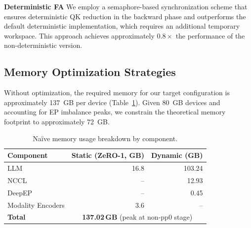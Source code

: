 \documentclass{article}
\begin{document}
\textbf{Deterministic FA} 
We employ a semaphore-based synchronization scheme that ensures deterministic QK reduction in the backward phase and outperforms the default deterministic implementation, which requires an additional temporary workspace. 
This approach achieves approximately $0.8\times$ the performance of the non-deterministic version.


\subsection{Memory Optimization Strategies}
Without optimization, the required memory for our target configuration is approximately 137~GB per device (Table~\ref{tab:mem-usage-naive}). 
Given 80~GB devices and accounting for EP imbalance peaks, we constrain the theoretical memory footprint to approximately 72~GB.

\begin{table}[htbp]
  \centering
    \caption{Naïve memory usage breakdown by component.}
    \label{tab:mem-usage-naive}
    \begin{tabular}{@{}l|rr@{}}
      \toprule
      \textbf{Component} & \textbf{Static (ZeRO-1, GB)} & \textbf{Dynamic (GB)} \\
      \midrule
      LLM                & 16.8  & 103.24 \\
      NCCL               & --    & 12.93  \\
      DeepEP             & --    & 0.45  \\
      Modality Encoders  & 3.6   & --     \\
      \midrule
      \textbf{Total} & \multicolumn{2}{c}{\textbf{137.02\,GB} (peak at non-pp0 stage)} \\
      \bottomrule
    \end{tabular}
\end{table}
\end{document}
